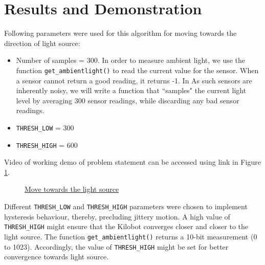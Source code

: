 \section{Results and Demonstration}
Following parameters were used for this algorithm for moving towards the direction of light source:
\begin{itemize}
\item Number of samples = 300. In order to measure ambient light, we  use the function \texttt{get\_ambientlight()} to read the current value for the sensor. When a sensor cannot return a good reading, it returns -1. In As such sensors are inherently noisy, we will write a function that ``samples" the current light level by averaging 300 sensor readings, while discarding any bad sensor readings.
\item \texttt{THRESH\_LOW} =  300
\item \texttt{THRESH\_HIGH} = 600
\end{itemize}
Video of working demo of problem statement can be accessed using link in Figure \ref{fig:move_towards_the_light}.
\begin{figure}[H]
	\centering
	\caption{\href{https://www.google.com/url?sa=j&url=https\%3A\%2F\%2Fphotos.app.goo.gl\%2FnUNghDg4nJygpzUu5&uct=1551610784&usg=G0tZGJ7iMN79F5qGk1QMw5rfodM.}{Move towards the light source}}
	\label{fig:move_towards_the_light}
\end{figure}
Different \texttt{THRESH\_LOW} and \texttt{THRESH\_HIGH} parameters were chosen to implement hysteresis behaviour, thereby, precluding jittery motion. A high value of  \texttt{THRESH\_HIGH} might ensure that the Kilobot converges closer and closer to the light source. The function \texttt{get\_ambientlight()} returns a 10-bit measurement (0 to 1023). Accordingly, the value of \texttt{THRESH\_HIGH} might be set for better convergence towards light source. 

